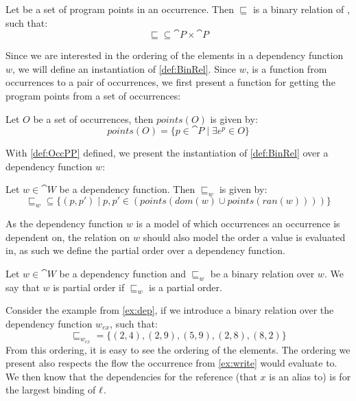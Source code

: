 \documentclass[acmsmall,sigplan]{acmart}
\begin{document}
\begin{definition}[]\label{def:BinRel}
	Let  be a set of program points in an occurrence.
	Then $\sqsubseteq$ is a binary relation of , such that:
	$$\sqsubseteq\subseteq\cat{P}\times\cat{P}$$
\end{definition}

Since we are interested in the ordering of the elements in a
dependency function $w$, we will define an instantiation of
\cref{def:BinRel}. 
Since $w$, is a function from occurrences to a pair of occurrences, we
first present a function for getting the program points from a set of
occurrences: 

\begin{definition}\label{def:OccPP}
	Let $O$ be a set of occurrences, then $points(O)$ is given by:
	$$points(O)=\{p\in\cat{P}\mid\exists e^p\in O\}$$
\end{definition}

With \cref{def:OccPP} defined, we present the instantiation of \cref{def:BinRel} over a dependency function $w$:

\begin{definition}[]\label{def:RelPoint}
	Let $w\in\cat{W}$ be a dependency function.
	Then $\sqsubseteq_w$ is given by:
	$$\sqsubseteq_w\subseteq\{(p,p')\mid p,p'\in(points(dom(w)\cup points(ran(w))))\}$$
\end{definition}

As the dependency function $w$ is a model of which occurrences an occurrence is dependent on, the relation on $w$ should also model the order a value is evaluated in, as such we define the partial order over a dependency function.

\begin{definition}
	Let $w\in\cat{W}$ be a dependency function and $\sqsubseteq_w$ be a binary relation over $w$.
	We say that $w$ is partial order if $\sqsubseteq_w$ is a partial order.
\end{definition}

\begin{example}[]\label{ex:depRel}
	Consider the example from \cref{ex:dep}, if we introduce a binary relation over the dependency function $w_{ex}$, such that:
	$$\sqsubseteq_{w_{ex}}=\{(2,4),(2,9),(5,9),(2,8),(8,2)\}$$
	From this ordering, it is easy to see the ordering of the elements.
	The ordering we present also respects the flow the occurrence from \cref{ex:write} would evaluate to.
	We then know that the dependencies for the reference (that $x$ is an alias to) is for the largest binding of $\ell$.
\end{example}
\end{document}
